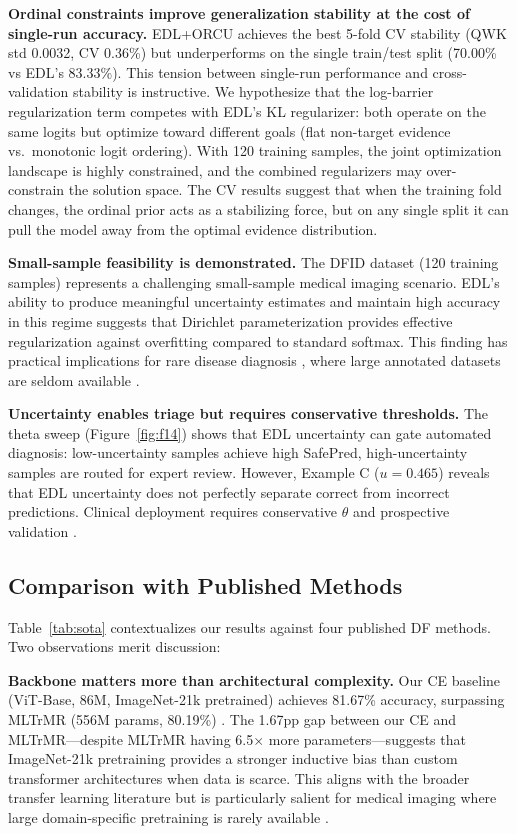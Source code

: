 \textbf{Ordinal constraints improve generalization stability at the cost of single-run accuracy.} EDL+ORCU achieves the best 5-fold CV stability (QWK std 0.0032, CV 0.36\%) but underperforms on the single train/test split (70.00\% vs EDL's 83.33\%). This tension between single-run performance and cross-validation stability is instructive. We hypothesize that the log-barrier regularization term competes with EDL's KL regularizer: both operate on the same logits but optimize toward different goals (flat non-target evidence vs.\ monotonic logit ordering). With 120 training samples, the joint optimization landscape is highly constrained, and the combined regularizers may over-constrain the solution space. The CV results suggest that when the training fold changes, the ordinal prior acts as a stabilizing force, but on any single split it can pull the model away from the optimal evidence distribution.

\textbf{Small-sample feasibility is demonstrated.} The DFID dataset (120 training samples) represents a challenging small-sample medical imaging scenario. EDL's ability to produce meaningful uncertainty estimates and maintain high accuracy in this regime suggests that Dirichlet parameterization provides effective regularization against overfitting compared to standard softmax. This finding has practical implications for rare disease diagnosis \cite{xie2024fewshot}, where large annotated datasets are seldom available \cite{zhang2023dentalai}.

\textbf{Uncertainty enables triage but requires conservative thresholds.} The theta sweep (Figure~\ref{fig:f14}) shows that EDL uncertainty can gate automated diagnosis: low-uncertainty samples achieve high SafePred, high-uncertainty samples are routed for expert review. However, Example C ($u=0.465$) reveals that EDL uncertainty does not perfectly separate correct from incorrect predictions. Clinical deployment requires conservative $\theta$ and prospective validation \cite{abdar2021uncertainty}.

\subsection{Comparison with Published Methods}

Table~\ref{tab:sota} contextualizes our results against four published DF methods. Two observations merit discussion:

\textbf{Backbone matters more than architectural complexity.} Our CE baseline (ViT-Base, 86M, ImageNet-21k pretrained) achieves 81.67\% accuracy, surpassing MLTrMR (556M params, 80.19\%) . The 1.67pp gap between our CE and MLTrMR---despite MLTrMR having 6.5$\times$ more parameters---suggests that ImageNet-21k pretraining provides a stronger inductive bias than custom transformer architectures when data is scarce. This aligns with the broader transfer learning literature \cite{raghu2019transfusion} but is particularly salient for medical imaging where large domain-specific pretraining is rarely available \cite{xie2024fewshot}.

